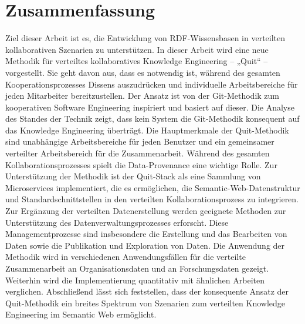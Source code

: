 \pagestyle{headings}

\section*{Zusammenfassung}
Ziel dieser Arbeit ist es, die Entwicklung von RDF-Wissensbasen in verteilten kollaborativen Szenarien zu unterstützen.
In dieser Arbeit wird eine neue Methodik für verteiltes kollaboratives Knowledge Engineering – „Quit“ – vorgestellt.
Sie geht davon aus, dass es notwendig ist, während des gesamten Kooperationsprozesses Dissens auszudrücken und individuelle Arbeitsbereiche für jeden Mitarbeiter bereitzustellen.
Der Ansatz ist von der Git-Methodik zum kooperativen Software Engineering inspiriert und basiert auf dieser.
Die Analyse des Standes der Technik zeigt, dass kein System die Git-Methodik konsequent auf das Knowledge Engineering überträgt.
Die Hauptmerkmale der Quit-Methodik sind unabhängige Arbeitsbereiche für jeden Benutzer und ein gemeinsamer verteilter Arbeitsbereich für die Zusammenarbeit.
Während des gesamten Kollaborationsprozesses spielt die Data-Provenance eine wichtige Rolle.
Zur Unterstützung der Methodik ist der Quit-Stack als eine Sammlung von Microservices implementiert, die es ermöglichen, die Semantic-Web-Datenstruktur und Standardschnittstellen in den verteilten Kollaborationsprozess zu integrieren.
Zur Ergänzung der verteilten Datenerstellung werden geeignete Methoden zur Unterstützung des Datenverwaltungsprozesses erforscht.
Diese Managementprozesse sind insbesondere die Erstellung und das Bearbeiten von Daten sowie die Publikation und Exploration von Daten.
Die Anwendung der Methodik wird in verschiedenen Anwendungsfällen für die verteilte Zusammenarbeit an Organisationsdaten und an Forschungsdaten gezeigt.
Weiterhin wird die Implementierung quantitativ mit ähnlichen Arbeiten verglichen.
Abschließend lässt sich feststellen, dass der konsequente Ansatz der Quit-Methodik ein breites Spektrum von Szenarien zum verteilten Knowledge Engineering im Semantic Web ermöglicht.

\clearpage


